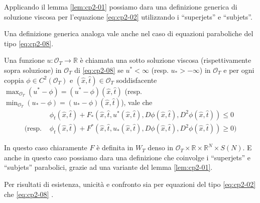 \begin{osservazione}
Applicando il lemma \ref{lem:cp2-01} possiamo dara una definizione generica di soluzione viscosa per l'equazione \eqref{eq:cp2-02} utilizzando i ``superjets'' e ``subjets''.
\end{osservazione}
Una definizione generica analoga vale anche nel caso di equazioni paraboliche del tipo \eqref{eq:cp2-08}.
\begin{definizione}
\label{def:cp2-02}
Una funzione $u:\mathcal{O}_T\to\mathbb{R}$ è chiamata una sotto soluzione viscosa (rispettivamente sopra soluzione) in $\mathcal{O}_T$ di \eqref{eq:cp2-08} se $u^*<\infty$ (resp. $u_*>-\infty$) in $\mathcal{O}_T$ e per ogni coppia $\phi\in C^2(\mathcal{O}_T)$ e $(\hat{x},\hat{t})\in\mathcal{O}_T$ soddisfacente $\max_{\mathcal{O}_T}(u^*-\phi)=(u^*-\phi)(\hat{x},\hat{t})$ (resp. $\min_{\mathcal{O}_T}(u_*-\phi)=(u_*-\phi)(\hat{x},\hat{t})$), vale che
\[
\begin{aligned}
&\phi_t(\hat{x},\hat{t}) + F_*(\hat{x},\hat{t},u^*(\hat{x},\hat{t}),D\phi(\hat{x},\hat{t}),D^2\phi(\hat{x},\hat{t}))\leq 0 \\
(\text{resp. }&\phi_t(\hat{x},\hat{t})+F^*(\hat{x},\hat{t},u_*(\hat{x},\hat{t}),D\phi(\hat{x},\hat{t}),D^2\phi(\hat{x},\hat{t}))\geq 0)
\end{aligned}
\]
\end{definizione}
\begin{osservazione}
In questo caso chiaramente $F$ è definita in $W_T$ denso in $\mathcal{O}_T\times\mathbb{R}\times\mathbb{R}^N\times S(N)$. E anche in questo caso possiamo dara una definizione che coinvolge i ``superjets'' e ``subjets'' parabolici, grazie ad una variante del lemma \ref{lem:cp2-01}. 
\end{osservazione}
Per risultati di esistenza, unicità e confronto sia per equazioni del tipo \eqref{eq:cp2-02} che \eqref{eq:cp2-08} \cite[vedi][]{crand:lion,giga:main,yun:giga}.
%
%
%
